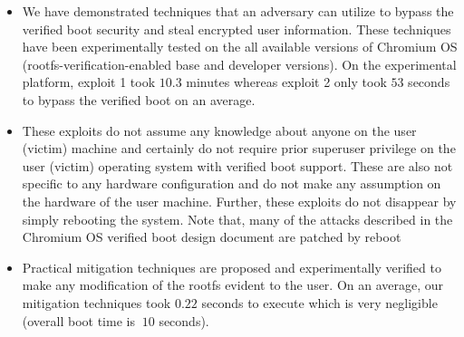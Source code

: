\documentclass[11pt]{article}
\begin{document}
\begin{itemize}
\item We have demonstrated techniques that an adversary can utilize to bypass the verified boot security and steal encrypted user information. These techniques have been experimentally tested on the all available versions of Chromium OS (rootfs-verification-enabled base and developer versions). On the experimental platform, exploit 1 took $10.3$ minutes whereas exploit 2 only took $53$ seconds to bypass the verified boot on an average.

\item These exploits do not assume any knowledge about anyone on the user (victim) machine and certainly do not require prior superuser privilege on the user (victim) operating system with verified boot support. These are also not specific to any hardware configuration and do not make any assumption on the hardware of the user machine. Further, these exploits do not disappear by simply rebooting the system. Note that, many of the attacks described in the Chromium OS verified boot design document are patched by reboot~\cite{verifiedboot}


\item Practical mitigation techniques are proposed and experimentally verified to make any modification of the rootfs evident to the user. On an average, our mitigation techniques took $0.22$ seconds to execute which is very negligible (overall boot time is $~10$ seconds).

\end{itemize}

\end{document}
